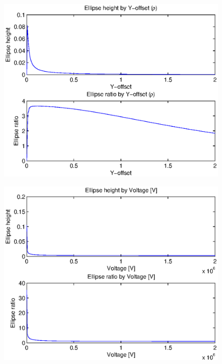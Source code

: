 \begin{figure}[tbh]
\includegraphics{figures/beam_deflection_script_05_elipse_ratio_by_bunch_intensity}
\centering
\caption{}
\label{fig:beam_deflection_script_05_elipse_ratio_by_bunch_intensity}
\end{figure}

\begin{figure}[tbh]
\includegraphics{figures/beam_deflection_script_06}
\centering
\caption{}
\label{fig:beam_deflection_script_06}
\end{figure}

